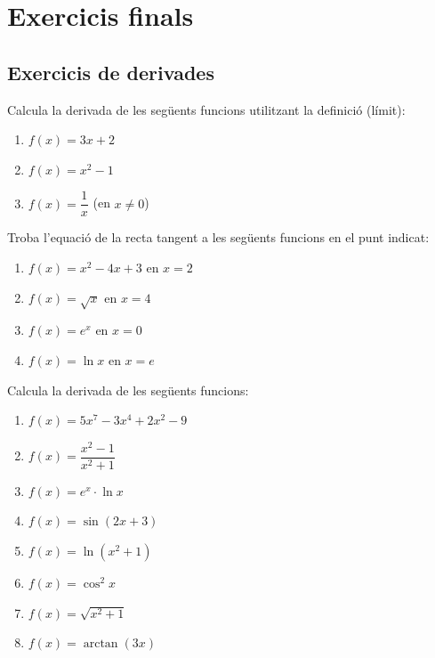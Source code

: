 \documentclass[12pt]{article}
\begin{document}
\section{Exercicis finals}

\subsection{Exercicis de derivades}

\begin{exercici}
Calcula la derivada de les següents funcions utilitzant la definició (límit):
\begin{enumerate}
    \item $f(x)=3x+2$
    \item $f(x)=x^2-1$
    \item $f(x)=\dfrac{1}{x}$ (en $x\neq 0$)
\end{enumerate}
\end{exercici}

\begin{exercici}
Troba l'equació de la recta tangent a les següents funcions en el punt indicat:
\begin{enumerate}
    \item $f(x)=x^2-4x+3$ en $x=2$
    \item $f(x)=\sqrt{x}$ en $x=4$
    \item $f(x)=e^x$ en $x=0$
    \item $f(x)=\ln x$ en $x=e$
\end{enumerate}
\end{exercici}

\begin{exercici}
Calcula la derivada de les següents funcions:
\begin{enumerate}
    \item $f(x)=5x^7-3x^4+2x^2-9$
    \item $f(x)=\dfrac{x^2-1}{x^2+1}$
    \item $f(x)=e^x\cdot \ln x$
    \item $f(x)=\sin(2x+3)$
    \item $f(x)=\ln(x^2+1)$
    \item $f(x)=\cos^2 x$
    \item $f(x)=\sqrt{x^2+1}$
    \item $f(x)=\arctan(3x)$
\end{enumerate}
\end{exercici}
\end{document}
